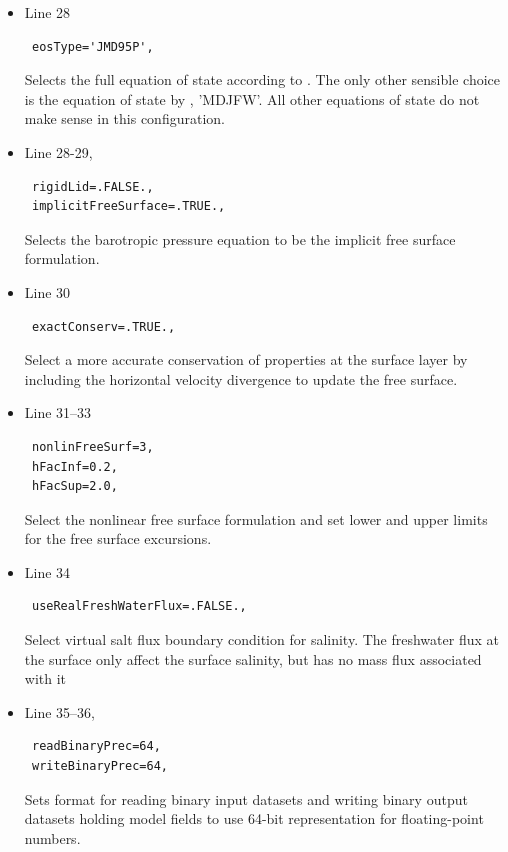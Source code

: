 {\begin{itemize}
\item Line 28
\begin{verbatim}
 eosType='JMD95P',
\end{verbatim}
  Selects the full equation of state according to 
  \citet{jackett95}. The only other sensible choice is the equation of
  state by \citet{mcdougall03}, 'MDJFW'. All other
  equations of state do not make sense in this configuration.\\

\item Line 28-29,
\begin{verbatim}
 rigidLid=.FALSE., 
 implicitFreeSurface=.TRUE., 
\end{verbatim}
  Selects the barotropic pressure equation to be the implicit free
  surface formulation.
\item Line 30
\begin{verbatim}
 exactConserv=.TRUE.,
\end{verbatim}
  Select a more accurate conservation of properties at the surface
  layer by including the horizontal velocity divergence to update the
  free surface.
\item Line 31--33
\begin{verbatim}
 nonlinFreeSurf=3,
 hFacInf=0.2,
 hFacSup=2.0,
\end{verbatim}
  Select the nonlinear free surface formulation and set lower and
  upper limits for the free surface excursions.
\item Line 34
\begin{verbatim}
 useRealFreshWaterFlux=.FALSE.,
\end{verbatim}
  Select virtual salt flux boundary condition for salinity. The
  freshwater flux at the surface only affect the surface salinity, but 
  has no mass flux associated with it

\item Line 35--36,
\begin{verbatim}
 readBinaryPrec=64,
 writeBinaryPrec=64,
\end{verbatim}
  Sets format for reading binary input datasets and 
  writing binary output datasets holding model fields to
  use 64-bit representation for floating-point numbers.\\


\end{itemize}}
